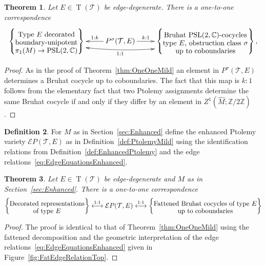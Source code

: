 \documentclass[11pt]{amsart}
\def\cxymatrix#1{\xy*[c]\xybox{\xymatrix#1}\endxy}
\theoremstyle{plain}
\newtheorem{theorem}{Theorem}[section]
\theoremstyle{definition}
\newtheorem{definition}[theorem]{Definition}
\numberwithin{equation}{section}
\newcommand{\Z}{\mathbb Z}
\newcommand{\C}{\mathbb C}
\newcommand{\T}{\mathcal T}
\newcommand{\E}{\mathcal E}
\DeclareMathOperator{\PSL}{PSL}
\DeclareMathOperator{\TE}{T}
\begin{document}
\begin{theorem}\label{thm:OneOneMildSigma}
Let $E\in \TE(\T)$ be edge-degenerate. There is a one-to-one correspondence
\begin{equation}\label{eq:OneOneMildSigma}
\cxymatrix{{
\left\{\txt{Type $E$ decorated\\boundary-unipotent\\$\pi_1(M)\to\PSL(2,\C)$}\right\}\ar@/_1pc/@{<->}[rr]_-{1:1}&P^\sigma(\T,E)\ar[l]_-{1:k}\ar[r]^-{k:1}&\left\{\txt{Bruhat $\PSL(2,\C)$-cocycles\\type $E$, obstruction class $\sigma$\\up to coboundaries}\right\},}}
\end{equation}
\end{theorem}
\begin{proof}
As in the proof of Theorem~\ref{thm:OneOneMild} an element in $P^\sigma(\T,E)$ determines a Bruhat cocycle up to coboundaries. The fact that this map is $k:1$ follows from the elementary fact that two Ptolemy assignments determine the same Bruhat cocycle if and only if they differ by an element in $Z^1(\widehat M;\Z/2\Z)$.
\end{proof}

\begin{definition}
For $M$ as in Section~\ref{sec:Enhanced} define the enhanced Ptolemy variety $\E P(\T,E)$ as in Definition~\ref{def:PtolemyMild} using the identification relations from Definition~\ref{def:EnhancedPtolemy} and the edge relations~\eqref{eq:EdgeEquationsEnhanced}.
\end{definition}

\begin{theorem}\label{thm:OneOneMildEnhanced}
Let $E\in \TE(\T)$ be edge-degenerate and $M$ as in Section~\ref{sec:Enhanced}. There is a one-to-one correspondence
\begin{equation}\label{eq:OneOneMildEnhanced}
\left\{\txt{Decorated representations\\of type $E$}\right\}\overset{\text{1:1}}{\longleftrightarrow}\E P(\T,E)\overset{\text{1:1}}{\longleftrightarrow}\left\{\txt{Fattened Bruhat cocycles of type $E$\\ up to coboundaries}\right\}
\end{equation}
\end{theorem}
\begin{proof}
The proof is identical to that of Theorem~\ref{thm:OneOneMild} using the fattened decomposition and the geometric interpretation of the edge relations~\eqref{eq:EdgeEquationsEnhanced} given in Figure~\ref{fig:FatEdgeRelationTop}.
\end{proof}
\end{document}
